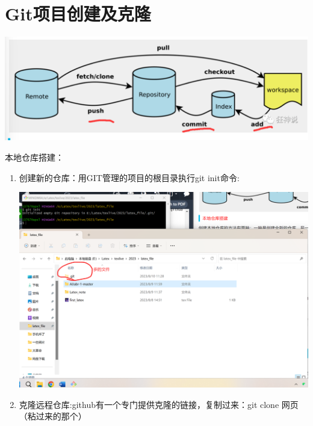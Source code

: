 \documentclass{article}
\begin{document}
\section{Git项目创建及克隆}
\includegraphics{image/8.1.png}

本地仓库搭建：
\begin{enumerate}
    \item 创建新的仓库：用GIT管理的项目的根目录执行git init命令:

    \includegraphics{image/8.2.png}

    \item 克隆远程仓库:github有一个专门提供克隆的链接，复制过来：git clone 网页（粘过来的那个）


\end{enumerate}
\end{document}
